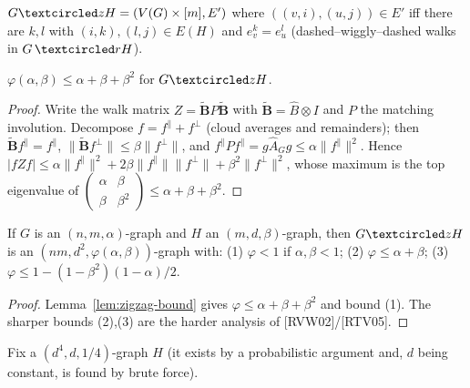 \begin{definition}
  \label{def:zigzag-product}
  $G\zigzag H=(V(G)\times[m],E')$ where $((v,i),(u,j))\in E'$ iff there are
  $k,l$ with $(i,k),(l,j)\in E(H)$ and $e_v^k=e_u^l$ (dashed--wiggly--dashed
  walks in $G\,\textcircled rH$).
\end{definition}

\begin{lemma}
  \label{lem:zigzag-bound}
  $\varphi(\alpha,\beta)\le\alpha+\beta+\beta^2$ for $G\zigzag H$.
\end{lemma}
\begin{proof}
  Write the walk matrix $Z=\tilde{\mathbf B}P\tilde{\mathbf B}$ with
  $\tilde{\mathbf B}=\hat B\otimes I$ and $P$ the matching involution. Decompose
  $f=f^\parallel+f^\perp$ (cloud averages and remainders); then
  $\tilde{\mathbf B}f^\parallel=f^\parallel$, $\|\tilde{\mathbf B}f^\perp\|\le
  \beta\|f^\perp\|$, and $f^\parallel Pf^\parallel=g\hat A_Gg\le\alpha\|f^\parallel
  \|^2$. Hence $|fZf|\le\alpha\|f^\parallel\|^2+2\beta\|f^\parallel\|\|f^\perp\|+
  \beta^2\|f^\perp\|^2$, whose maximum is the top eigenvalue of
  $\left(\begin{smallmatrix}\alpha&\beta\\\beta&\beta^2\end{smallmatrix}\right)
  \le\alpha+\beta+\beta^2$.
\end{proof}

\begin{theorem}
  \label{thm:zigzag-theorem}
  If $G$ is an $(n,m,\alpha)$-graph and $H$ an $(m,d,\beta)$-graph, then $G\zigzag
  H$ is an $(nm,d^2,\varphi(\alpha,\beta))$-graph with: (1) $\varphi<1$ if
  $\alpha,\beta<1$; (2) $\varphi\le\alpha+\beta$; (3)
  $\varphi\le1-(1-\beta^2)(1-\alpha)/2$.
\end{theorem}
\begin{proof}
  Lemma~\ref{lem:zigzag-bound} gives $\varphi\le\alpha+\beta+\beta^2$ and bound
  (1). The sharper bounds (2),(3) are the harder analysis of [RVW02]/[RTV05].
\end{proof}

\begin{construction}
  \label{constr:building-block-H}
  Fix a $(d^4,d,1/4)$-graph $H$ (it exists by a probabilistic argument and, $d$
  being constant, is found by brute force).
\end{construction}

